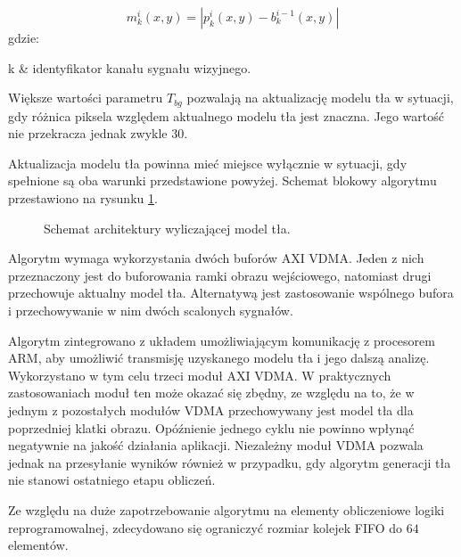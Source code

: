 \begin{enumerate}
	\begin{equation}
	\label{eq:background-model-background-mask-2}
	m^i_k(x,y) = | p^i_k(x,y) - b^{i-1}_k(x,y)|
	\end{equation}
	gdzie:
	\begin{conditions}
		k & identyfikator kanału sygnału wizyjnego. \\ %
	\end{conditions}
	
	Większe wartości parametru $T_{bg}$ pozwalają na aktualizację modelu tła w sytuacji, gdy różnica piksela względem aktualnego modelu tła jest znaczna. 
	Jego wartość nie przekracza jednak zwykle $30$.
\end{enumerate}

Aktualizacja modelu tła powinna mieć miejsce wyłącznie w sytuacji, gdy spełnione są oba warunki przedstawione powyżej.
Schemat blokowy algorytmu przestawiono na rysunku \ref{fig:background-model}.

\begin{figure}[h]
	\centering
	\def\svgwidth{\textwidth}
	
	\caption{Schemat architektury wyliczającej model tła.}
	\label{fig:background-model}
\end{figure}

Algorytm wymaga wykorzystania dwóch buforów AXI VDMA. 
Jeden z nich przeznaczony jest do buforowania ramki obrazu wejściowego, natomiast drugi przechowuje aktualny model tła. 
Alternatywą jest zastosowanie wspólnego bufora i przechowywanie w nim dwóch scalonych sygnałów. %

Algorytm zintegrowano z układem umożliwiającym komunikację z procesorem ARM, aby umożliwić transmisję uzyskanego modelu tła i jego dalszą analizę. %
Wykorzystano w tym celu trzeci moduł AXI VDMA. %
W praktycznych zastosowaniach moduł ten może okazać się zbędny, ze względu na to, że w jednym z pozostałych modułów VDMA przechowywany jest model tła dla poprzedniej klatki obrazu. 
Opóźnienie jednego cyklu nie powinno wpłynąć negatywnie na jakość działania aplikacji. 
Niezależny moduł VDMA pozwala jednak na przesyłanie wyników również w przypadku, gdy algorytm generacji tła nie stanowi ostatniego etapu obliczeń.


Ze względu na duże zapotrzebowanie algorytmu na elementy obliczeniowe logiki reprogramowalnej, zdecydowano się ograniczyć rozmiar kolejek FIFO do $64$ elementów.

